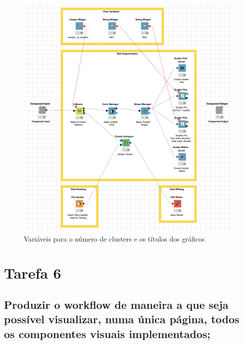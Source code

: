 \documentclass{article}
\begin{document}
\begin{figure}[H]
    \centering
    \includegraphics[scale=0.4]{Images/T5_b.png}
    \caption{Variáveis para o número de clusters e os títulos dos gráficos}
\end{figure}

\clearpage

\section{Tarefa 6}

\subsection{Produzir o workflow de maneira a que seja possível visualizar, numa única página, todos os componentes visuais implementados;}
\end{document}
